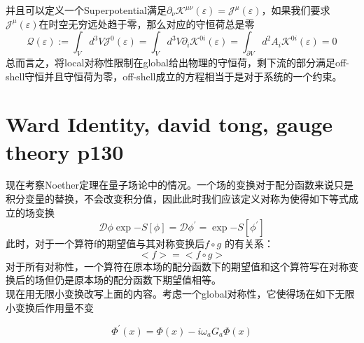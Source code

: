 \documentclass[10pt,openany]{book}
\theoremstyle{thmstyle} %
\theoremstyle{defstyle} %
\theoremstyle{prostyle} %
\begin{document}
并且可以定义一个Superpotential满足$ \partial_\nu \mathcal{K}^{\mu \nu}(\varepsilon)=\mathcal{J}^\mu(\varepsilon) $，如果我们要求$ \mathcal{J}^\mu(\varepsilon) $在时空无穷远处趋于零，那么对应的守恒荷总是零
\begin{equation}
  \mathcal{Q}(\varepsilon):=\int_V d^3 V \mathcal{J}^0(\varepsilon)=\int_V d^3 V \partial_i \mathcal{K}^{0 i}(\varepsilon)=\int_{\partial V} d^2 A_i \mathcal{K}^{0 i}(\varepsilon)=0
\end{equation}  
总而言之，将local对称性限制在global给出物理的守恒荷，剩下流的部分满足off-shell守恒并且守恒荷为零，off-shell成立的方程相当于是对于系统的一个约束。

\section{Ward Identity, david tong, gauge theory p130}
现在考察Noether定理在量子场论中的情况。一个场的变换对于配分函数来说只是积分变量的替换，不会改变积分值，因此此时我们应该定义对称为使得如下等式成立的场变换
\begin{equation}
  \mathcal{D} \phi \exp{-S[\phi]} = \mathcal{D} \phi^\prime = \exp{-S[\phi^\prime]}
\end{equation}
此时，对于一个算符f的期望值与其对称变换后$ f\circ g $ 的有关系：
\begin{equation}
  <f>=<f\circ g>
\end{equation}
对于所有对称性，一个算符在原本场的配分函数下的期望值和这个算符写在对称变换后的场但仍是原本场的配分函数下期望值相等。\\
现在用无限小变换改写上面的内容。考虑一个global对称性，它使得场在如下无限小变换后作用量不变

  \begin{equation}
    \Phi^{\prime}(x)=\Phi(x)-i \omega_a G_a \Phi(x)
    \end{equation}
\end{document}
